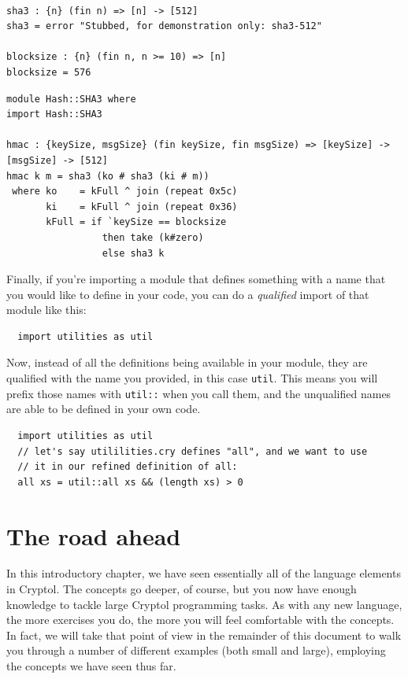 \begin{verbatim}

sha3 : {n} (fin n) => [n] -> [512]
sha3 = error "Stubbed, for demonstration only: sha3-512"

blocksize : {n} (fin n, n >= 10) => [n]
blocksize = 576
\end{verbatim}

\begin{verbatim}
module Hash::SHA3 where
import Hash::SHA3

hmac : {keySize, msgSize} (fin keySize, fin msgSize) => [keySize] -> [msgSize] -> [512]
hmac k m = sha3 (ko # sha3 (ki # m))
 where ko    = kFull ^ join (repeat 0x5c)
       ki    = kFull ^ join (repeat 0x36)
       kFull = if `keySize == blocksize
                 then take (k#zero)
                 else sha3 k
\end{verbatim}

Finally, if you're importing a module that defines something with
a name that you would like to define in your code, you can do a
{\it qualified} import of that module like this:

\begin{verbatim}
  import utilities as util
\end{verbatim}

Now, instead of all the definitions being available in your module,
they are qualified with the name you provided, in this case \verb+util+.
This means you will prefix those names with \verb+util::+ when you call them,
and the unqualified names are able to be defined in your own code.

\begin{verbatim}
  import utilities as util
  // let's say utililities.cry defines "all", and we want to use
  // it in our refined definition of all:
  all xs = util::all xs && (length xs) > 0
\end{verbatim}

\section{The road ahead}
\label{sec:road-ahead}

In this introductory chapter, we have seen essentially all of the
language elements in Cryptol. The concepts go deeper, of course, but
you now have enough knowledge to tackle large Cryptol programming
tasks. As with any new language, the more exercises you do, the more
you will feel comfortable with the concepts. In fact, we will take
that point of view in the remainder of this document to walk you
through a number of different examples (both small and large),
employing the concepts we have seen thus far.

